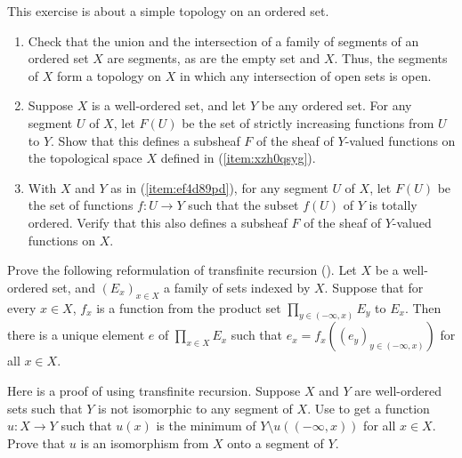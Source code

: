 \documentclass{article}
\begin{document}
\begin{exercise}
  \label{exe:rpm18mof}
  This exercise is about a simple topology on an ordered set.
  \begin{enumerate}
  \item \label{item:xzh0qsyg} Check that the union and the
    intersection of a family of segments of an ordered set \(X\) are
    segments, as are the empty set and \(X\).  Thus, the segments of
    \(X\) form a topology on \(X\) in which any intersection of open
    sets is open.
  \item \label{item:ef4d89pd} Suppose \(X\) is a well-ordered set, and
    let \(Y\) be any ordered set.  For any segment \(U\) of \(X\), let
    \(F(U)\) be the set of strictly increasing functions from \(U\) to
    \(Y\).  Show that this defines a subsheaf \(F\) of the sheaf of
    \(Y\)-valued functions on the topological space \(X\) defined in
    (\ref{item:xzh0qsyg}).
  \item With \(X\) and \(Y\) as in (\ref{item:ef4d89pd}), for any
    segment \(U\) of \(X\), let \(F(U)\) be the set of functions
    \(f : U \to Y\) such that the subset \(f(U)\) of \(Y\) is totally
    ordered.  Verify that this also defines a subsheaf \(F\) of the
    sheaf of \(Y\)-valued functions on \(X\).
  \end{enumerate}
\end{exercise}

\begin{exercise}
  \label{exe:oh59gz4i}
  Prove the following reformulation of transfinite recursion
  ().  Let \(X\) be a well-ordered set, and
  \((E_x)_{x \in X}\) a family of sets indexed by \(X\).  Suppose that
  for every \(x \in X\), \(f_x\) is a function from the product set
  \(\prod_{y \in (-\infty, x)} E_y\) to \(E_x\).  Then there is a
  unique element \(e\) of \(\prod_{x \in X} E_x\) such that
  \(e_x = f_x((e_y)_{y \in (-\infty, x)})\) for all \(x \in X\).
\end{exercise}

\begin{exercise}
  \label{exe:eghnwow2}
  Here is a proof of  using transfinite recursion.
  Suppose \(X\) and \(Y\) are well-ordered sets such that \(Y\) is not
  isomorphic to any segment of \(X\).  Use  to
  get a function \(u : X \to Y\) such that \(u(x)\) is the minimum of
  \(Y \setminus u((-\infty, x))\) for all \(x \in X\).  Prove that
  \(u\) is an isomorphism from \(X\) onto a segment of \(Y\).
\end{exercise}
\end{document}
